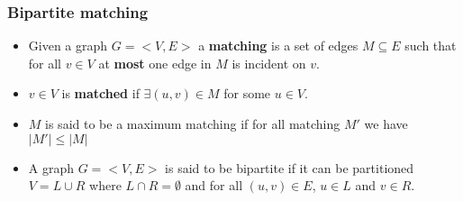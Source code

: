 \documentclass{beamer}
\begin{document}
\begin{frame}
\begin{figure}[]
{
     }
  \end{figure}
\end{frame}
\begin{frame}
  \frametitle{Bipartite matching}

  \begin{itemize}
    \item Given a graph $G=<V,E>$  a \textbf{matching} is a set of edges $M\subseteq E$ such that for all $v\in V$ at \textbf{most} one edge in $M$ is incident on $v$.
    \item $v\in V$ is \textbf{matched} if $\exists (u,v)\in M$ for some $u\in V$.
    \item $M$ is said to be a maximum matching if for all matching $M'$  we have $|M'|\le |M|$
    \item A graph $G=<V,E>$ is said to be bipartite if it can be partitioned $V=L\cup R$ where $L\cap R=\emptyset$ and for all $(u,v)\in E$, $u\in L$ and $v\in R$.
  \end{itemize}

\end{frame}
\end{document}
